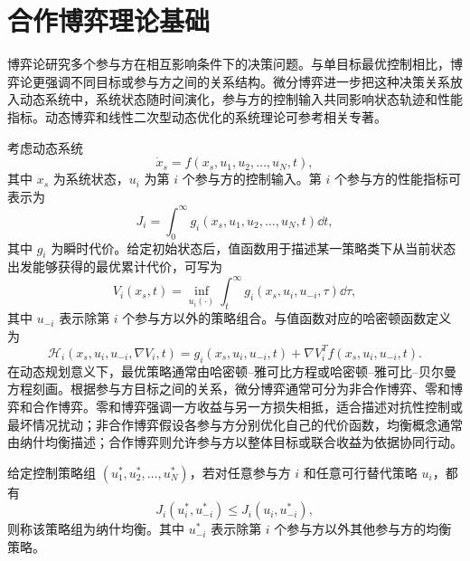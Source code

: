 \section{合作博弈理论基础}
\label{sec:ch2_game_control}

博弈论研究多个参与方在相互影响条件下的决策问题。与单目标最优控制相比，博弈论更强调不同目标或参与方之间的关系结构。微分博弈进一步把这种决策关系放入动态系统中，系统状态随时间演化，参与方的控制输入共同影响状态轨迹和性能指标。动态博弈和线性二次型动态优化的系统理论可参考相关专著\cite{basar1999dynamic,engwerda2005lqdg,anderson2007optimal}。

考虑动态系统
\begin{equation}
  \dot x_s=f(x_s,u_1,u_2,\ldots,u_N,t),
  \label{eq:ch2_game_system}
\end{equation}
其中 $x_s$ 为系统状态，$u_i$ 为第 $i$ 个参与方的控制输入。第 $i$ 个参与方的性能指标可表示为
\begin{equation}
  J_i=\int_0^\infty g_i(x_s,u_1,u_2,\ldots,u_N,t)\dd t,
  \label{eq:ch2_game_cost}
\end{equation}
其中 $g_i$ 为瞬时代价。给定初始状态后，值函数用于描述某一策略类下从当前状态出发能够获得的最优累计代价，可写为
\begin{equation}
  V_i(x_s,t)=\inf_{u_i(\cdot)}
  \int_t^\infty g_i(x_s,u_i,u_{-i},\tau)\dd \tau ,
  \label{eq:ch2_value_function}
\end{equation}
其中 $u_{-i}$ 表示除第 $i$ 个参与方以外的策略组合。与值函数对应的哈密顿函数定义为
\begin{equation}
  \mathcal H_i(x_s,u_i,u_{-i},\nabla V_i,t)
  =g_i(x_s,u_i,u_{-i},t)+\nabla V_i^Tf(x_s,u_i,u_{-i},t).
  \label{eq:ch2_hamiltonian_game}
\end{equation}
在动态规划意义下，最优策略通常由哈密顿--雅可比方程或哈密顿--雅可比--贝尔曼方程刻画。根据参与方目标之间的关系，微分博弈通常可分为非合作博弈、零和博弈和合作博弈。零和博弈强调一方收益与另一方损失相抵，适合描述对抗性控制或最坏情况扰动；非合作博弈假设各参与方分别优化自己的代价函数，均衡概念通常由纳什均衡描述；合作博弈则允许参与方以整体目标或联合收益为依据协同行动。

\begin{definition}[纳什均衡]
\label{def:ch2_nash}
给定控制策略组 $(u_1^*,u_2^*,\ldots,u_N^*)$，若对任意参与方 $i$ 和任意可行替代策略 $u_i$，都有
\begin{equation}
  J_i(u_i^*,u_{-i}^*)\le J_i(u_i,u_{-i}^*),
  \label{eq:ch2_nash}
\end{equation}
则称该策略组为纳什均衡。其中 $u_{-i}^*$ 表示除第 $i$ 个参与方以外其他参与方的均衡策略。
\end{definition}

